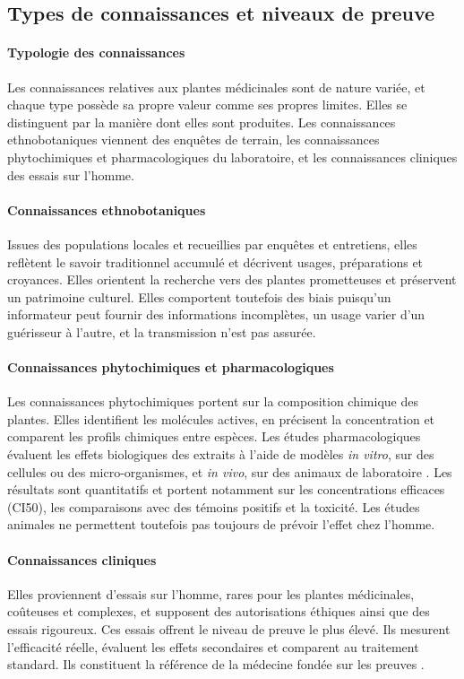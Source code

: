 \subsection{Types de connaissances et niveaux de preuve}
\label{subsec:types_connaissances}

\paragraph{Typologie des connaissances}
Les connaissances relatives aux plantes médicinales sont de nature variée, et chaque type possède sa propre valeur comme ses propres limites. Elles se distinguent par la manière dont elles sont produites. Les connaissances ethnobotaniques viennent des enquêtes de terrain, les connaissances phytochimiques et pharmacologiques du laboratoire, et les connaissances cliniques des essais sur l'homme.

\paragraph{Connaissances ethnobotaniques}
Issues des populations locales et recueillies par enquêtes et entretiens, elles reflètent le savoir traditionnel accumulé et décrivent usages, préparations et croyances. Elles orientent la recherche vers des plantes prometteuses et préservent un patrimoine culturel. Elles comportent toutefois des biais puisqu'un informateur peut fournir des informations incomplètes, un usage varier d'un guérisseur à l'autre, et la transmission n'est pas assurée.

\paragraph{Connaissances phytochimiques et pharmacologiques}
Les connaissances phytochimiques portent sur la composition chimique des plantes. Elles identifient les molécules actives, en précisent la concentration et comparent les profils chimiques entre espèces. Les études pharmacologiques évaluent les effets biologiques des extraits à l'aide de modèles \textit{in vitro}, sur des cellules ou des micro-organismes, et \textit{in vivo}, sur des animaux de laboratoire \cite{heinrich2004pharmacognosy}. Les résultats sont quantitatifs et portent notamment sur les concentrations efficaces (CI50), les comparaisons avec des témoins positifs et la toxicité. Les études animales ne permettent toutefois pas toujours de prévoir l'effet chez l'homme.

\paragraph{Connaissances cliniques}
Elles proviennent d'essais sur l'homme, rares pour les plantes médicinales, coûteuses et complexes, et supposent des autorisations éthiques ainsi que des essais rigoureux. Ces essais offrent le niveau de preuve le plus élevé. Ils mesurent l'efficacité réelle, évaluent les effets secondaires et comparent au traitement standard. Ils constituent la référence de la médecine fondée sur les preuves \cite{sackett_evidence_1996}.

